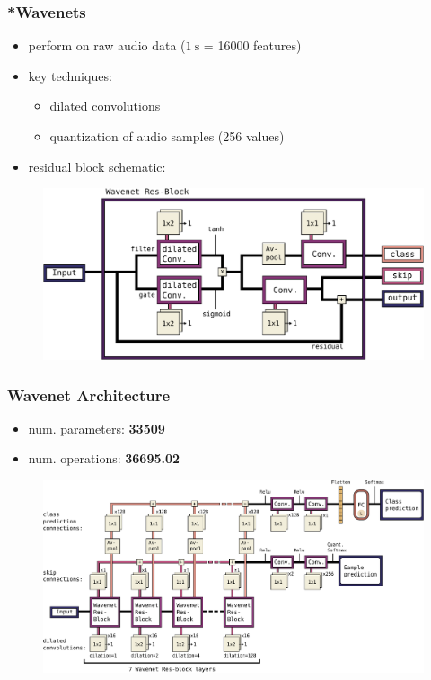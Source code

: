 \begin{frame}
  \frametitle{*Wavenets}
  \begin{itemize}
    \item perform  on raw audio data ($\SI{1}{\second}$ = 16000 features)
    \item key techniques: 
    \begin{itemize}
      \item dilated convolutions
      \item quantization of audio samples (256 values)
    \end{itemize}
    \item residual block schematic:
  \end{itemize}
  \vspace{-0.2cm}
  \begin{figure} \includegraphics[height=0.35\textheight]{../4_nn/figs/nn_arch_wavenet_block.pdf} \end{figure}
\end{frame}

\begin{frame}
  \frametitle{Wavenet Architecture}
  \begin{itemize}
    \item num. parameters: \textbf{\num{33509}}
    \item num. operations: \textbf{\SI{36695.02}{\kilo\ops}}
  \end{itemize}
  \vspace{-0.2cm}
  \begin{figure} \includegraphics[height=0.6\textheight]{../4_nn/figs/nn_arch_wavenet_all.pdf} \end{figure}
\end{frame}